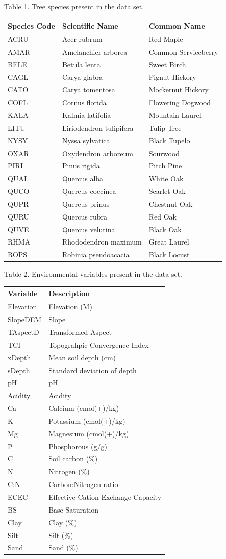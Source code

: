 \documentclass[
  12pt,
]{article}
\begin{document}
Table 1. Tree species present in the data set.

\begin{longtable}[]{@{}lll@{}}
\toprule
Species Code & Scientific Name & Common Name\tabularnewline
\midrule
\endhead
ACRU & Acer rubrum & Red Maple\tabularnewline
AMAR & Amelanchier arborea & Common Serviceberry\tabularnewline
BELE & Betula lenta & Sweet Birch\tabularnewline
CAGL & Carya glabra & Pignut Hickory\tabularnewline
CATO & Carya tomentosa & Mockernut Hickory\tabularnewline
COFL & Cornus florida & Flowering Dogwood\tabularnewline
KALA & Kalmia latifolia & Mountain Laurel\tabularnewline
LITU & Liriodendron tulipifera & Tulip Tree\tabularnewline
NYSY & Nyssa sylvatica & Black Tupelo\tabularnewline
OXAR & Oxydendron arboreum & Sourwood\tabularnewline
PIRI & Pinus rigida & Pitch Pine\tabularnewline
QUAL & Quercus alba & White Oak\tabularnewline
QUCO & Quercus coccinea & Scarlet Oak\tabularnewline
QUPR & Quercus prinus & Chestnut Oak\tabularnewline
QURU & Quercus rubra & Red Oak\tabularnewline
QUVE & Quercus velutina & Black Oak\tabularnewline
RHMA & Rhododendron maximum & Great Laurel\tabularnewline
ROPS & Robinia pseudoacacia & Black Locust\tabularnewline
\bottomrule
\end{longtable}

\newpage

Table 2. Environmental variables present in the data set.

\begin{longtable}[]{@{}ll@{}}
\toprule
Variable & Description\tabularnewline
\midrule
\endhead
Elevation & Elevation (M)\tabularnewline
SlopeDEM & Slope\tabularnewline
TAspectD & Transformed Aspect\tabularnewline
TCI & Topograhpic Convergence Index\tabularnewline
xDepth & Mean soil depth (cm)\tabularnewline
sDepth & Standard deviation of depth\tabularnewline
pH & pH\tabularnewline
Acidity & Acidity\tabularnewline
Ca & Calcium (cmol(+)/kg)\tabularnewline
K & Potassium (cmol(+)/kg)\tabularnewline
Mg & Magnesium (cmol(+)/kg)\tabularnewline
P & Phosphorous (g/g)\tabularnewline
C & Soil carbon (\%)\tabularnewline
N & Nitrogen (\%)\tabularnewline
C:N & Carbon:Nitrogen ratio\tabularnewline
ECEC & Effective Cation Exchange Capacity\tabularnewline
BS & Base Saturation\tabularnewline
Clay & Clay (\%)\tabularnewline
Silt & Silt (\%)\tabularnewline
Sand & Sand (\%)\tabularnewline
\bottomrule
\end{longtable}

\newpage
\end{document}
